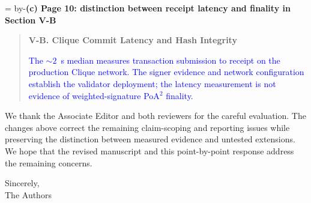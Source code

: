 \documentclass[11pt]{article}
\newenvironment{excerpt}{\begin{quote}\small\sloppy}{\end{quote}}
\newcommand{\roomfor}[1]{\par\begingroup\dimen0=\pagegoal\advance\dimen0 by-\pagetotal\ifdim\dimen0<#1\baselineskip\newpage\fi\endgroup}
\newcommand{\loc}[1]{\roomfor{7}\medskip\noindent\textbf{#1}\par\smallskip}
\newcommand{\mshead}[2]{\par\noindent\textbf{#1. #2}\par\smallskip}
\begin{document}
\loc{(c) Page 10: distinction between receipt latency and finality in Section V-B}
\begin{excerpt}
\mshead{V-B}{Clique Commit Latency and Hash Integrity}

\textcolor{blue}{The ${\sim}2$~s median measures transaction submission
to receipt on the production Clique network. The signer evidence
and network configuration establish the validator deployment;
the latency measurement is not evidence of weighted-signature
PoA$^2$ finality.}
\end{excerpt}


\bigskip
We thank the Associate Editor and both reviewers for the careful evaluation.
The changes above correct the remaining claim-scoping and reporting issues
while preserving the distinction between measured evidence and untested
extensions. We hope that the revised manuscript and this point-by-point
response address the remaining concerns.

\medskip
Sincerely,\\
The Authors
\end{document}
